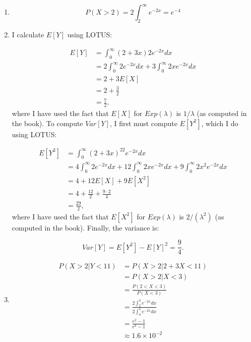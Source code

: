 \begin{problem}{11} $ $

\begin{enumerate}
\item

\begin{equation*}
P(X>2)  = 2 \int_2^{\infty}e^{-2 x} = e^{-4}
\end{equation*}

\item I calculate $E[Y]$ using LOTUS:

\begin{align*}
E[Y] &= \int_0^\infty (2+3x)2 e^{-2x}dx \\
 & = 2\int_0^\infty 2 e^{-2x}dx+3\int_0^\infty 2x e^{-2x}dx \\
 & = 2+3E[X]\\
 &=2+\frac{3}{2} \\
 & = \frac{7}{2},
\end{align*}
where I have used the fact that $E[X]$ for $Exp(\lambda)$ is $1/\lambda$ (as computed in the book).
To compute $Var[Y]$, I first must compute $E[Y^2]$, which I do using LOTUS:

\begin{align*}
E[Y^2] &= \int_0^\infty (2+3x)^22 e^{-2x}dx \\
 & = 4\int_0^\infty 2 e^{-2x}dx+12\int_0^\infty 2x e^{-2x}dx+9\int_0^\infty 2x^2 e^{-2x}dx \\
 & = 4+12E[X]+9E[X^2]\\
 &=4+\frac{12}{2}+\frac{9 \cdot 2}{4} \\
 & = \frac{29}{2},
\end{align*}
where I have used the fact that $E[X^2]$ for $Exp(\lambda)$ is $2/(\lambda^2)$ (as computed in the book).  Finally, the variance is:

\begin{equation*}
Var[Y] = E[Y^2]-E[Y]^2 = \frac{9}{4}.
\end{equation*}

\item

\begin{align*}
P(X>2|Y<11) &=P(X>2|2+3X<11) \\
&=P(X>2|X<3) \\
&=\frac{P(2<X<3)}{P(X<3)} \\
& = \frac{2 \int_2^3 e^{-2x}dx}{2 \int_0^3 e^{-2x}dx} \\
& = \frac{e^{2}-1}{e^{6}-1}\\
& \approx 1.6 \times 10^{-2}
\end{align*}


\end{enumerate}



\end{problem}



